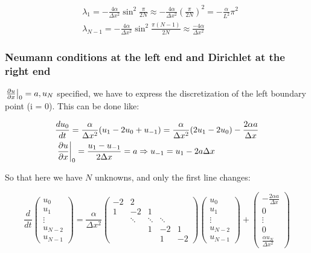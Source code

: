 \begin{equation}
\begin{aligned}
&\lambda _{1} = -\frac{4\alpha}{\Delta x^2} \sin ^2 \frac{\pi}{2N} \approx - \frac{4\alpha}{\Delta x^2} \left( \frac{\pi}{2N} \right)^2 = - \frac{\alpha}{L^2}\pi ^2\\
&\lambda _{N-1} = -\frac{4\alpha}{\Delta x^2} \sin ^2 \frac{\pi (N-1)}{2 N}\approx \frac{-4 \alpha}{\Delta x^2} 
\end{aligned}
\end{equation}

\subsubsection{Neumann conditions at the left end and Dirichlet at the right end}
 $\left.\frac{\partial u}{\partial x}\right|_0 = a, u_N$ specified, we have to express the discretization of the left boundary point (i = 0). This can be done like: 

\begin{equation}
\begin{aligned}
&\frac{d u _0}{dt} = \frac{\alpha}{\Delta x^2} (u_1 -2u_0 + u_{-1}) = \frac{\alpha }{\Delta x^2}(2u_1 - 2 u_0) - \frac{2\alpha a}{\Delta x}\\
&\left. \frac{\partial u}{\partial x}\right|_0 = \frac{u_1 - u_{-1}}{2\Delta x} = a \Rightarrow u_{-1} = u_1 - 2a \Delta x
\end{aligned}
\end{equation}

So that here we have $N$ unknowns, and only the first line changes:

\begin{equation}
\frac{d}{dt} \left(\begin{array}{c}
u_0\\
u_1 \\
\vdots\\
u_{N-2}\\
u_{N-1}
\end{array} \right) = \frac{\alpha }{\Delta x^2}
\left(
\begin{array}{ccccc}
-2 & 2  \\
1 & -2 & 1  \\
& \ddots & \ddots & \ddots \\
&  & 1 & -2 & 1\\
& & & 1& -2
\end{array}
\right)\left(\begin{array}{c}
u_0\\
u_1 \\
\vdots\\
u_{N-2}\\
u_{N-1}
\end{array} \right)
+
\left(\begin{array}{c}
-\frac{2\alpha a}{\Delta x}\\
0\\
\vdots\\
0\\
\frac{\alpha u_N}{\Delta x^2}
\end{array} \right)
\end{equation}

